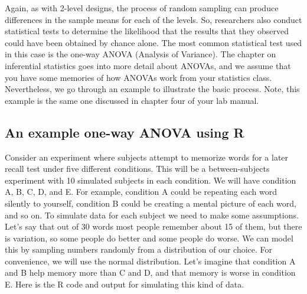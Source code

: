 Again, as with 2-level designs, the process of random sampling can
produce differences in the sample means for each of the levels. So,
researchers also conduct statistical tests to determine the likelihood
that the results that they observed could have been obtained by chance
alone. The most common statistical test used in this case is the one-way
ANOVA (Analysis of Variance). The chapter on inferential statistics goes
into more detail about ANOVAs, and we assume that you have some memories
of how ANOVAs work from your statistics class. Nevertheless, we go
through an example to illustrate the basic process. Note, this example
is the same one discussed in chapter four of your lab manual.

\subsection{An example one-way ANOVA using
R}\label{an-example-one-way-anova-using-r}

Consider an experiment where subjects attempt to memorize words for a
later recall test under five different conditions. This will be a
between-subjects experiment with 10 simulated subjects in each
condition. We will have condition A, B, C, D, and E. For example,
condition A could be repeating each word silently to yourself, condition
B could be creating a mental picture of each word, and so on. To
simulate data for each subject we need to make some assumptions. Let's
say that out of 30 words most people remember about 15 of them, but
there is variation, so some people do better and some people do worse.
We can model this by sampling numbers randomly from a distribution of
our choice. For convenience, we will use the normal distribution. Let's
imagine that condition A and B help memory more than C and D, and that
memory is worse in condition E. Here is the R code and output for
simulating this kind of data.

\begin{Shaded}
\begin{Highlighting}[]
\NormalTok{(}\NormalTok{(}\NormalTok{,}\NormalTok{,}\NormalTok{))}
\NormalTok{(}\NormalTok{(}\NormalTok{,}\NormalTok{,}\NormalTok{))}
\NormalTok{(}\NormalTok{(}\NormalTok{,}\NormalTok{,}\NormalTok{))}
\NormalTok{(}\NormalTok{(}\NormalTok{,}\NormalTok{,}\NormalTok{))}
\NormalTok{(}\NormalTok{(}\NormalTok{,}\NormalTok{,}\NormalTok{))}
\NormalTok{)}
\end{Highlighting}
\end{Shaded}

